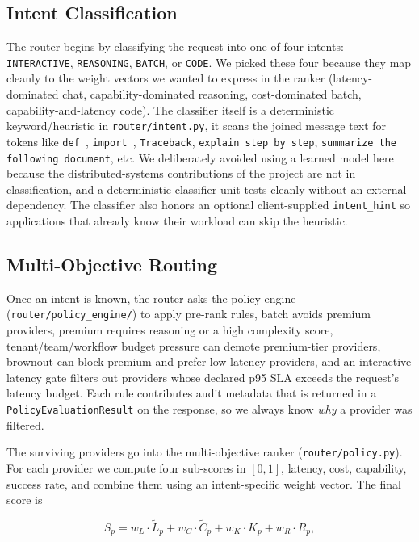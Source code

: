 \documentclass[conference,letterpaper]{IEEEtran}
\begin{document}
\subsection{Intent Classification}
The router begins by classifying the request into one of four
intents: \texttt{INTERACTIVE}, \texttt{REASONING}, \texttt{BATCH}, or
\texttt{CODE}. We picked these four because they map cleanly to the
weight vectors we wanted to express in the ranker (latency-dominated
chat, capability-dominated reasoning, cost-dominated batch,
capability-and-latency code). The classifier itself is a deterministic
keyword/heuristic in \texttt{router/intent.py}, it scans the
joined message text for tokens like \texttt{def\,}, \texttt{import\,},
\texttt{Traceback}, \texttt{explain step by step}, \texttt{summarize
the following document}, etc. We deliberately avoided using a learned
model here because the distributed-systems contributions of the
project are not in classification, and a deterministic classifier
unit-tests cleanly without an external dependency. The classifier
also honors an optional client-supplied \texttt{intent\_hint} so
applications that already know their workload can skip the heuristic.

\subsection{Multi-Objective Routing}
Once an intent is known, the router asks the policy engine
(\texttt{router/policy\_engine/}) to apply pre-rank rules, batch
avoids premium providers, premium requires reasoning or a high
complexity score, tenant/team/workflow budget pressure can demote
premium-tier providers, brownout can block premium and prefer
low-latency providers, and an interactive latency gate filters out
providers whose declared p95 SLA exceeds the request's latency
budget. Each rule contributes audit metadata that is returned in a
\texttt{PolicyEvaluationResult} on the response, so we always know
\emph{why} a provider was filtered.

The surviving providers go into the multi-objective ranker
(\texttt{router/policy.py}). For each provider we compute four
sub-scores in $[0,1]$, latency, cost, capability, success rate,
and combine them using an intent-specific weight vector. The final
score is

\begin{equation}
S_p = w_L \cdot \tilde{L}_p + w_C \cdot \tilde{C}_p
    + w_K \cdot K_p + w_R \cdot R_p,
\label{eq:score}
\end{equation}
\end{document}
